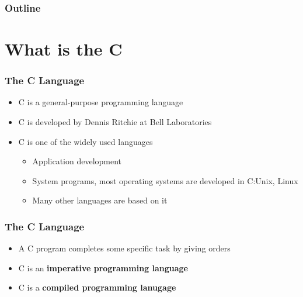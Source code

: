 \documentclass{../c-lecture}
\subtitle{C Programming Basics}
\begin{document}
\begin{frame}
  \titlepage{}
\end{frame}
\begin{frame}
  \frametitle{Outline}
  \tableofcontents{}
\end{frame}

\section{What is the C}

\begin{frame}
  \frametitle{The C Language}
  \begin{itemize}
    \item {\color{YellowOrange} C} is a
      {\color{YellowOrange} general-purpose} programming language
    \item {\color{LimeGreen}C} is developed by
      {\color{LimeGreen} Dennis Ritchie} at
      {\color{LimeGreen} Bell Laboratories}
    \item {\color{Orange} C} is one of the widely used languages
    \begin{itemize}
      \item Application development
      \item System programs, most operating systems are developed in C:\@ Unix, Linux
      \item Many other languages are based on it
    \end{itemize}
  \end{itemize}
\end{frame}

\begin{frame}
  \frametitle{The C Language}
  \begin{itemize}
    \item A C program completes some specific task by giving orders
    \item C is an \textbf{\color{Orange} imperative programming language}
    \item C is a \textbf{\color{LimeGreen} compiled programming lanugage}
  \end{itemize}
\end{frame}
\end{document}
